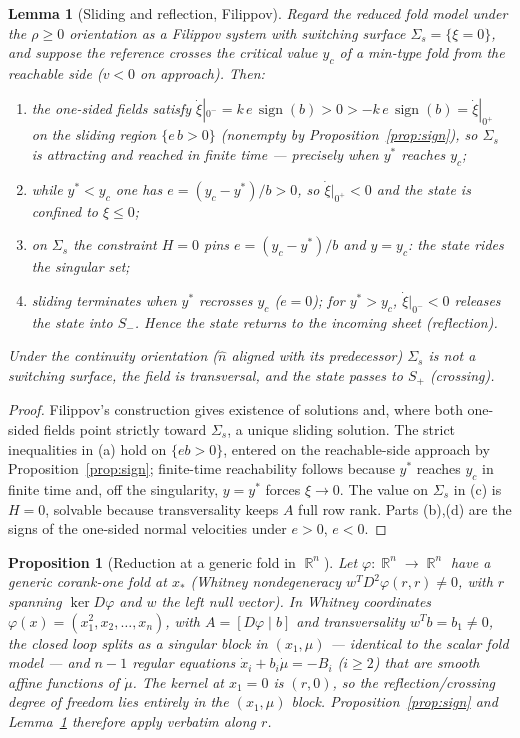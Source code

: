 \documentclass[11pt,american]{article}
\DeclareMathOperator{\sign}{sign}
\DeclareMathOperator{\R}{\mathbb{R}}
\newtheorem{lemma}{Lemma}
\newtheorem{proposition}{Proposition}
\theoremstyle{definition}
\theoremstyle{plain}
\theoremstyle{remark}
\begin{document}
\begin{lemma}[Sliding and reflection, Filippov]\label{lem:filippov}
Regard the reduced fold model under the $\rho\ge0$ orientation as a Filippov system with switching surface $\Sigma_s=\{\xi=0\}$, and suppose the reference crosses the critical value $y_c$ of a min-type fold from the reachable side ($v<0$ on approach). Then:
\begin{enumerate}
\item[(a)] the one-sided fields satisfy $\dot\xi|_{0^-} = k\,e\,\sign(b) > 0 > -k\,e\,\sign(b) = \dot\xi|_{0^+}$ on the sliding region $\{e\,b>0\}$ (nonempty by Proposition~\ref{prop:sign}), so $\Sigma_s$ is attracting and reached in finite time --- precisely when $y^*$ reaches $y_c$;
\item[(b)] while $y^*<y_c$ one has $e=(y_c-y^*)/b>0$, so $\dot\xi|_{0^+}<0$ and the state is confined to $\xi\le0$;
\item[(c)] on $\Sigma_s$ the constraint $H=0$ pins $e=(y_c-y^*)/b$ and $y=y_c$: the state rides the singular set;
\item[(d)] sliding terminates when $y^*$ recrosses $y_c$ ($e=0$); for $y^*>y_c$, $\dot\xi|_{0^-}<0$ releases the state into $S_-$. Hence the state returns to the incoming sheet (reflection).
\end{enumerate}
Under the continuity orientation ($\hat n$ aligned with its predecessor) $\Sigma_s$ is not a switching surface, the field is transversal, and the state passes to $S_+$ (crossing).
\end{lemma}

\begin{proof}
Filippov's construction \cite{Filippov1988} gives existence of solutions and, where both one-sided fields point strictly toward $\Sigma_s$, a unique sliding solution. The strict inequalities in (a) hold on $\{eb>0\}$, entered on the reachable-side approach by Proposition~\ref{prop:sign}; finite-time reachability follows because $y^*$ reaches $y_c$ in finite time and, off the singularity, $y=y^*$ forces $\xi\to0$. The value on $\Sigma_s$ in (c) is $H=0$, solvable because transversality keeps $A$ full row rank. Parts (b),(d) are the signs of the one-sided normal velocities under $e>0$, $e<0$.
\end{proof}



\begin{proposition}[Reduction at a generic fold in $\R^n$]\label{prop:reduction}
Let $\varphi:\R^n\to\R^n$ have a generic corank-one fold at $x_*$ (Whitney nondegeneracy $w^TD^2\varphi(r,r)\ne0$, with $r$ spanning $\ker D\varphi$ and $w$ the left null vector). In Whitney coordinates $\varphi(x)=(x_1^2,x_2,\dots,x_n)$, with $A=[D\varphi\mid b]$ and transversality $w^Tb = b_1 \ne 0$, the closed loop splits as a singular block in $(x_1,\mu)$ --- identical to the scalar fold model --- and $n-1$ regular equations $\dot x_i + b_i\dot\mu = -B_i$ ($i\ge2$) that are smooth affine functions of $\dot\mu$. The kernel at $x_1=0$ is $(r,0)$, so the reflection/crossing degree of freedom lies entirely in the $(x_1,\mu)$ block. Proposition~\ref{prop:sign} and Lemma~\ref{lem:filippov} therefore apply verbatim along $r$.
\end{proposition}
\end{document}
